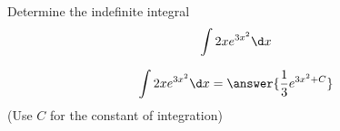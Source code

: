 \documentclass{ximera}
\author{Jason Miller}
\begin{document}
\begin{exercise}
Determine the indefinite integral
\[
\int 2xe^{3x^{2}} \d  x 
\]



\[
\int 2xe^{3x^{2}} \d x=\answer{\frac{1}{3}e^{3x^{2} +C}}
\]
(Use $C$ for the constant of integration)

\end{exercise}
\end{document}
